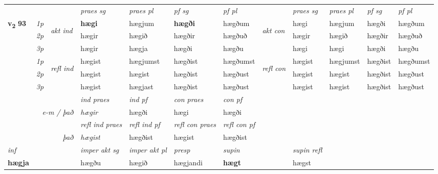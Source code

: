 \begin{longtable}[l]{X>{\footnotesize\itshape}llXXXXlXXXX}
 & &   & \textit{praes sg}  & \textit{praes pl}    & \textit{ pf sg} & \textit{pf pl} & & \textit{praes sg}  & \textit{praes pl}    & \textit{pf sg} & \textit{pf pl }  \\ \cmidrule{4-7} \cmidrule{9-12}
 \multirow{2}{*}{{{\textbf{v{\textsubscript{2}}} \Large{\textbf{93}}}}}  & 1p & \multirow{3}{*}{\begin{turn}{90}\textit{akt ind}\end{turn}} & \textbf{hægi} & hægjum & \textbf{hægði} & hægðum & \multirow{3}{*}{\begin{turn}{90}\textit{akt con}\end{turn}} &hægi & hægjum & hægði & hægðum\\*
 & 2p &  &  hægir  & hægið & hægðir & hægðuð & & hægir & hægið & hægðir & hægðuð \\*
 & 3p &  & hægir & hægja & hægði & hægðu & & hægi & hægi& hægði & hægðu \\*
\cmidrule{4-7} \cmidrule{9-12}
 & 1p & \multirow{3}{*}{\begin{turn}{90}\textit{refl ind}\end{turn}}  & hægist & hægjumst & hægðist & hægðumst & \multirow{3}{*}{\begin{turn}{90}\textit{refl con}\end{turn}}  &hægist & hægjumst & hægðist & hægðumst \\*
 & 2p &  & hægist & hægist & hægðist & hægðust & &hægist & hægist & hægðist & hægðust \\*
 & 3p  & & hægist & hægjast & hægðist & hægðust & & hægist & hægist& hægðist & hægðust \\*
\cmidrule{4-7} \cmidrule{9-12}

   && &  \textit{ind praes} & \textit{ind pf} & \textit{con praes} & \textit{con pf} \\*
\multicolumn{3}{r}{\textit{e-m / það}} & hægir & hægði & hægi & hægði \\*

\cmidrule{4-7}
 & && \textit{refl ind praes} & \textit{refl ind pf} & \textit{refl con praes} & \textit{refl con pf} \\*
\multicolumn{3}{r}{\textit{það}}& hægist & hægðist & hægist & hægðist \\*

\cmidrule{4-7}
   {\textit{inf}} & &  & \textit{imper akt sg} & \textit{imper akt pl}   & \textit{presp} & \textit{supin} && \textit{supin refl}  \\*
  {\textbf{hægja}} & && hægðu  & hægið   & hægjandi &  \textbf{hægt} && hægst  \\*


\end{longtable}
